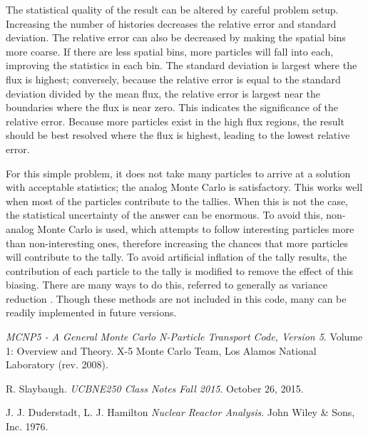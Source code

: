 \documentclass[11pt, oneside]{article}   	%
\begin{document}
The statistical quality of the result can be altered by careful problem setup. Increasing the number of histories decreases the relative error and standard deviation. The relative error can also be decreased by making the spatial bins more coarse. If there are less spatial bins, more particles will fall into each, improving the statistics in each bin. The standard deviation is largest where the flux is highest; conversely, because the relative error is equal to the standard deviation divided by the mean flux, the relative error is largest near the boundaries where the flux is near zero. This indicates the significance of the relative error. Because more particles exist in the high flux regions, the result should be best resolved where the flux is highest, leading to the lowest relative error.

For this simple problem, it does not take many particles to arrive at a solution with acceptable statistics; the analog Monte Carlo is satisfactory. This works well when most of the particles contribute to the tallies. When this is not the case, the statistical uncertainty of the answer can be enormous. To avoid this, non-analog Monte Carlo is used, which attempts to follow interesting particles more than non-interesting ones, therefore increasing the chances that more particles will contribute to the tally. To avoid artificial inflation of the tally results, the contribution of each particle to the tally is modified to remove the effect of this biasing. There are many ways to do this, referred to generally as variance reduction \cite{MCNP}. Though these methods are not included in this code, many can be readily implemented in future versions.

\begin{thebibliography}{9}

\textit{MCNP5 - A General Monte Carlo N-Particle Transport Code, Version 5}.
Volume 1: Overview and Theory. X-5 Monte Carlo Team, Los Alamos National Laboratory (rev. 2008).

R. Slaybaugh.
\textit{UCBNE250 Class Notes Fall 2015}.
October 26, 2015.

J. J. Duderstadt, L. J. Hamilton
\textit{Nuclear Reactor Analysis}.
John Wiley \& Sons, Inc. 1976.




\end{thebibliography}
\end{document}
